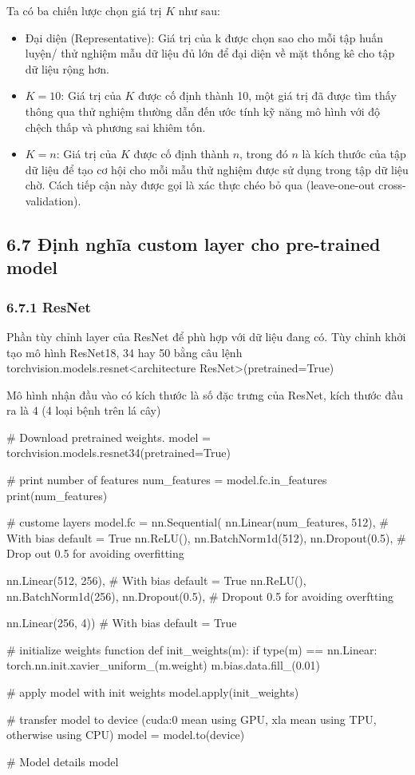 \documentclass{article}
\begin{document}
	Ta có ba chiến lược chọn giá trị $K$ như sau:
	\begin{itemize}
		\item Đại diện (Representative): Giá trị của k được chọn sao cho mỗi tập huấn luyện/ thử nghiệm mẫu dữ liệu đủ lớn để đại diện về mặt thống kê cho tập dữ liệu rộng hơn.
		\item $K = 10$: Giá trị của $K$ được cố định thành 10, một giá trị đã được tìm thấy thông qua thử nghiệm thường dẫn đến ước tính kỹ năng mô hình với độ chệch thấp và phương sai khiêm tốn.
		\item $K = n$: Giá trị của $K$ được cố định thành $n$, trong đó $n$ là kích thước của tập dữ liệu để tạo cơ hội cho mỗi mẫu thử nghiệm được sử dụng trong tập dữ liệu chờ. Cách tiếp cận này được gọi là xác thực chéo bỏ qua (leave-one-out cross-validation).
	\end{itemize}
	\subsection{6.7 Định nghĩa custom layer cho pre-trained model}
	
	\subsubsection{6.7.1 ResNet}
	Phần tùy chỉnh layer của ResNet để phù hợp với dữ liệu đang có. Tùy chỉnh khởi tạo mô hình ResNet18, 34 hay 50 bằng câu lệnh torchvision.models.resnet<architecture ResNet>(pretrained=True)
	
	Mô hình nhận đầu vào có kích thước là số đặc trưng của ResNet, kích thước đầu ra là 4 (4 loại bệnh trên lá cây)
	\begin{python}
		# Download pretrained weights.
		model = torchvision.models.resnet34(pretrained=True)
		
		# print number of features
		num_features = model.fc.in_features
		print(num_features)
		
		
		# custome layers
		model.fc = nn.Sequential(
		nn.Linear(num_features, 512), # With bias default = True
		nn.ReLU(),
		nn.BatchNorm1d(512),
		nn.Dropout(0.5), # Drop out 0.5 for avoiding overfitting
		
		nn.Linear(512, 256), # With bias default = True
		nn.ReLU(),
		nn.BatchNorm1d(256),
		nn.Dropout(0.5), # Dropout 0.5 for avoiding overftting
		
		nn.Linear(256, 4)) # With bias default = True
		
		# initialize weights function
		def init_weights(m):
			if type(m) == nn.Linear:
			torch.nn.init.xavier_uniform_(m.weight)
			m.bias.data.fill_(0.01)
		
		# apply model with init weights
		model.apply(init_weights)
		
		# transfer model to device (cuda:0 mean using GPU, xla mean using TPU, otherwise using CPU)
		model = model.to(device)
		
		# Model details
		model
	\end{python}
\end{document}
